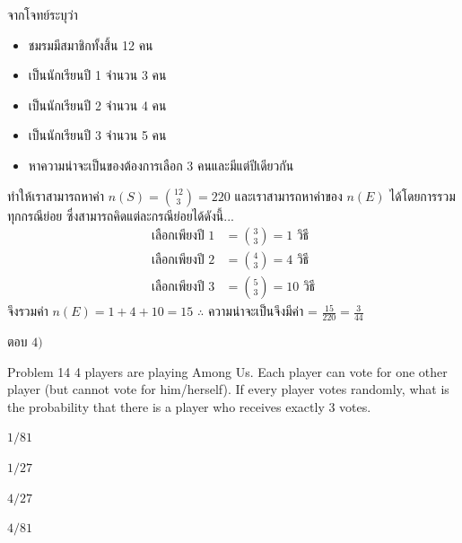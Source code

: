 \documentclass[11pt]{scrartcl}
\renewcommand{\binom}[2]{\genfrac{(}{)}{0pt}{0}{#1}{#2}}
\begin{document}
\begin{solutionbox}
  จากโจทย์ระบุว่า
  \begin{itemize}
    \item ชมรมมีสมาชิกทั้งสิ้น 12 คน
    \item เป็นนักเรียนปี 1 จำนวน 3 คน
    \item เป็นนักเรียนปี 2 จำนวน 4 คน
    \item เป็นนักเรียนปี 3 จำนวน 5 คน
    \item หาความน่าจะเป็นของต้องการเลือก 3 คนและมีแต่ปีเดียวกัน
  \end{itemize}
  
  ทำให้เราสามารถหาค่า $n(S) = \binom{12}{3} = 220$ และเราสามารถหาค่าของ $n(E)$ ได้โดยการรวมทุกกรณีย่อย ซึ่งสามารถคิดแต่ละกรณีย่อยได้ดังนี้...
  \begin{align*}
    \text{เลือกเพียงปี 1} &= \binom{3}{3} = 1 \text{ วิธี} \\
    \text{เลือกเพียงปี 2} &= \binom{4}{3} = 4 \text{ วิธี} \\
    \text{เลือกเพียงปี 3} &= \binom{5}{3} = 10 \text{ วิธี}
  \end{align*} 
  จึงรวมค่า $n(E) = 1+4+10 = 15$
  $\therefore$ ความน่าจะเป็นจึงมีค่า = $\frac{15}{220} = \frac{3}{44}$

  ตอบ $\boxed{4)}$
\end{solutionbox}

\newpage

\begin{problembox}{Problem 14}
4 players are playing Among Us. Each player can vote for one other player (but cannot vote for him/herself). If every player votes randomly, what is the probability that there is a player who receives exactly 3 votes.
 
\begin{choices}
\item $1/81$
\item $1/27$
\item $4/27$
\item $4/81$
\end{choices}
\end{problembox}
\end{document}
